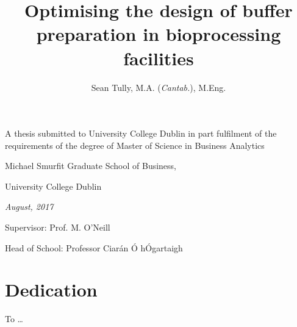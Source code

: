 \documentclass[a4paper,12pt,bibtotoc]{book}
\numberwithin{equation}{section}
\numberwithin{figure}{chapter}
\begin{document}
\frontmatter 

\title
{Optimising the design of buffer preparation in bioprocessing facilities}

\author{Sean Tully, M.A. (\emph{Cantab.}), M.Eng.}

\maketitle

{\normalsize 
\vfill
\begin{center} 
\textup{A thesis submitted to University College Dublin in part fulfilment 
of the requirements of the degree of Master of Science in Business Analytics}
\end{center}
\vfill
\begin{center} 
Michael Smurfit Graduate School of Business,
\end{center}
\begin{center} 
University College Dublin
\end{center}
\vfill
\begin{center} 
\textit{August, 2017}
\end{center}
\vfill
\begin{center} 
\textup{Supervisor: Prof. M. O'Neill}
\end{center}
\vfill
\begin{center} 
\textup{Head of School: Professor Ciar\'an \'O h\'Ogartaigh}
\end{center}
\vfill
}

\thispagestyle{empty}

\clearpage

\chapter*{Dedication} 
To \ldots


\cleardoublepage
\tableofcontents
\clearpage

\listoffigures{}
\clearpage

\listoftables{}

\listofalgorithms{}



\end{document}
